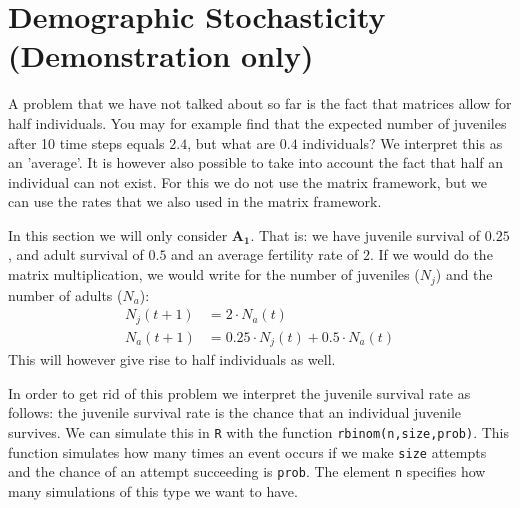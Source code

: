 \documentclass{article}\usepackage[]{graphicx}\usepackage[]{color}
\begin{document}
\section{Demographic Stochasticity (Demonstration only)}
A problem that we have not talked about so far is the fact that matrices allow for half individuals. You may for example find that the expected number of juveniles after 10 time steps equals $2.4$, but what are $0.4$ individuals? We interpret this as an 'average'. It is however also possible to take into account the fact that half an individual can not exist. For this we do not use the matrix framework, but we can use the rates that we also used in the matrix framework.

In this section we will only consider $\boldsymbol{A_1}$. That is: we have juvenile survival of $0.25$, and adult survival of $0.5$ and an average fertility rate of $2$. If we would do the matrix multiplication, we would write for the number of juveniles ($N_j$) and the number of adults ($N_a$):
\begin{align*}
N_j(t+1) &= 2\cdot N_a (t)\\
N_a(t+1) &= 0.25\cdot N_j(t) + 0.5\cdot N_a(t)
\end{align*}
This will however give rise to half individuals as well.

In order to get rid of this problem we interpret the juvenile survival rate as follows: the juvenile survival rate is the chance that an individual juvenile survives. We can simulate this in \texttt{R} with the function \texttt{rbinom(n,size,prob)}. This function simulates how many times an event occurs if we make \texttt{size} attempts and the chance of an attempt succeeding is \texttt{prob}. The element \texttt{n} specifies how many simulations of this type we want to have.
\end{document}
